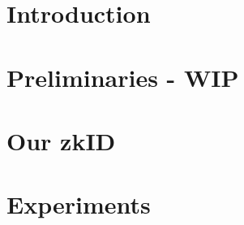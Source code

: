 \documentclass{iacrtrans}
\newcommand{\ndhy}[2]{{\color{blue}{}ndhy: #2}}
\begin{document}


\section{Introduction}
\label{sec:introduction}


\section{Preliminaries - WIP}
\label{sec:preliminaries}

\section{Our zkID}
\label{sec:contribution}


\section{Experiments}
\label{sec:experiments}

\end{document}
